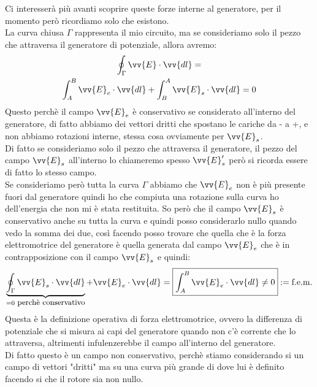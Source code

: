 \documentclass[a4paper, oneside]{article}
\begin{document}
    Ci interesserà più avanti scoprire queste forze interne al generatore, per il momento però ricordiamo solo che esistono.\\
    La curva chiusa $\Gamma$ rappresenta il mio circuito, ma se consideriamo solo il pezzo che attraversa il generatore di potenziale, allora avremo:
    \begin{gather*}
        \oint_\Gamma \vv{E} \cdot \vv{dl} = \\
        \int_{A}^{B} \vv{E}_e \cdot \vv{dl} + \int_{B}^{A} \vv{E}_s \cdot \vv{dl} = 0
    \end{gather*}
    Questo perchè il campo $\vv{E}_e$ è conservativo se considerato all'interno del generatore, di fatto abbiamo dei vettori dritti che spostano le cariche da - a +, e non abbiamo rotazioni interne, stessa cosa ovviamente per $\vv{E}_s$.\\
    Di fatto se consideriamo solo il pezzo che attraversa il generatore, il pezzo del campo $\vv{E}_s$ all'interno lo chiameremo spesso $\vv{E}_s'$ però si ricorda essere di fatto lo stesso campo.\\
    Se consideriamo però tutta la curva $\Gamma$ abbiamo che $\vv{E}_e$ non è più presente fuori dal generatore quindi ho che compiuta una rotazione sulla curva ho dell'energia che non mi è stata restituita. So però che il campo $\vv{E}_s$ è conservativo anche su 
    tutta la curva e quindi posso considerarlo nullo quando vedo la somma dei due, così facendo posso trovare che quella che è la forza elettromotrice del generatore è quella generata dal campo $\vv{E}_e$ che è in contrapposizione con il campo $\vv{E}_s$ e quindi:
    \begin{gather*}
        \underbrace{\oint_\Gamma \vv{E}_s \cdot \vv{dl}}_{= 0 \text{\small{ perchè conservativo}}} + \vv{E}_e \cdot \vv{dl} = \boxed{\int_{A}^{B} \vv{E}_e \cdot \vv{dl} \neq 0} := \text{f.e.m.}
    \end{gather*}
    Questa è la definizione operativa di forza elettromotrice, ovvero la differenza di potenziale che si misura ai capi del generatore quando non c'è corrente che lo attraversa, altrimenti infulenzerebbe il campo all'interno del generatore.\\
    Di fatto questo è un campo non conservativo, perchè stiamo considerando si un campo di vettori "dritti" ma su una curva più grande di dove lui è definito facendo si che il rotore sia non nullo.\\
\end{document}
